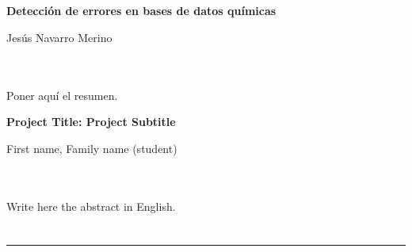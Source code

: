 \chapter*{}



\thispagestyle{empty}

\begin{center}
{\large\bfseries Detección de errores en bases de datos químicas}\\
\end{center}
\begin{center}
Jesús Navarro Merino\\
\end{center}

\\

\vspace{0.7cm}
\\

Poner aquí el resumen.
\cleardoublepage


\thispagestyle{empty}


\begin{center}
{\large\bfseries Project Title: Project Subtitle}\\
\end{center}
\begin{center}
First name, Family name (student)\\
\end{center}

\\

\vspace{0.7cm}
\\

Write here the abstract in English.

\chapter*{}
\thispagestyle{empty}

\noindent\rule[-1ex]{\textwidth}{2pt}\\[4.5ex]

